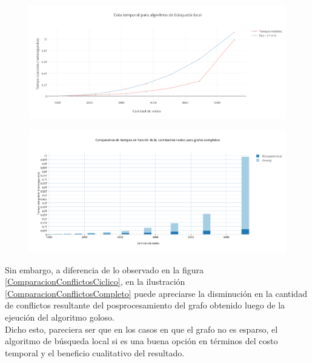  \begin{figure}[H]
    \begin{center}
  	\includegraphics[width=18cm]{imagenes/Ej5/TiemposLocalCompleto.png}
 	\label{TiemposLocalCompleto}
    \end{center}
  \end{figure}

 \begin{figure}[H]
    \begin{center}
  	\includegraphics[width=18cm]{imagenes/Ej5/ComparacionTiemposCompleto.png}
 	\label{ComparacionTiemposCompleto}
    \end{center}
  \end{figure}

Sin embargo, a diferencia de lo observado en la figura \ref{ComparacionConflictosCiclico}, en la ilustración \ref{ComparacionConflictosCompleto} puede apreciarse la disminución en la cantidad de conflictos resultante del posprocesamiento del grafo obtenido luego de la ejeución del algoritmo goloso.\\
Dicho esto, pareciera ser que en los casos en que el grafo no es esparso, el algoritmo de búsqueda local si es una buena opción en términos del costo temporal y el beneficio cualitativo del resultado.

